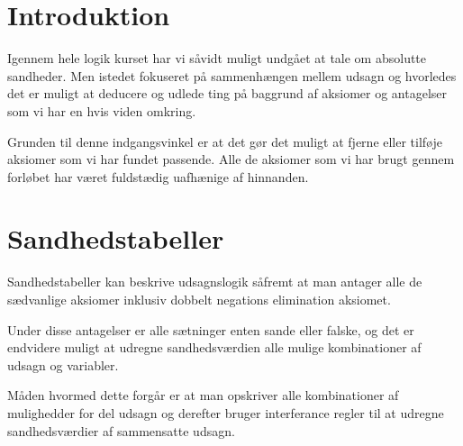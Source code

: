 \ifx\preampleIncluded\undefined
\def\startSamlet{}


\fi


\section{Introduktion}
Igennem hele logik kurset har vi såvidt muligt undgået at tale om absolutte sandheder.
Men istedet fokuseret på sammenhængen mellem udsagn og hvorledes det er
muligt at deducere og udlede ting på baggrund af aksiomer og antagelser som vi har en hvis viden omkring.

Grunden til denne indgangsvinkel er at det gør det muligt at fjerne eller tilføje aksiomer som vi har fundet passende.
Alle de aksiomer som vi har brugt gennem forløbet har været fuldstædig uafhænige af hinnanden.

\section{Sandhedstabeller}
Sandhedstabeller kan beskrive udsagnslogik såfremt at man antager alle de sædvanlige aksiomer
inklusiv dobbelt negations elimination aksiomet.

Under disse antagelser er alle sætninger enten sande eller falske,
og det er endvidere muligt at udregne sandhedsværdien alle mulige kombinationer af udsagn og variabler.

Måden hvormed dette forgår er at man opskriver alle kombinationer af mulighedder for del udsagn og
derefter bruger interferance regler til at udregne sandhedsværdier af sammensatte udsagn.

